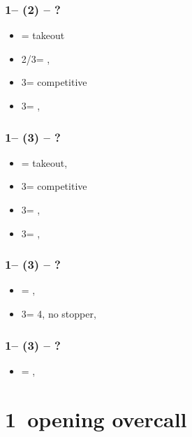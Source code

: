 \documentclass[12pt, a4paper]{report}
\begin{document}
\subsubsection*{1\diams -- (2\spades) -- ?}
\begin{itemize}
    \item \dbl = takeout
    \item 2\nt/3\clubs = \trsf{\clubs/\diams}, \invp
    \item 3\diams = competitive
    \item 3\hearts = \nat, \gf
\end{itemize}

\subsubsection*{1\diams -- (3\clubs) -- ?}
\begin{itemize}
    \item \dbl = takeout, \gf
    \item 3\diams = competitive
    \item 3\hearts = \spades, \invp
    \item 3\spades = \hearts, \gf
\end{itemize}

\subsubsection*{1\diams -- (3\hearts) -- ?}
\begin{itemize}
    \item \dbl = \spades, \gf
    \item 3\spades = 4\spades, no \hearts stopper, \gf
\end{itemize}

\subsubsection*{1\diams -- (3\spades) -- ?}
\begin{itemize}
    \item \dbl = \hearts, \gf
\end{itemize}

\section*{\colorbox{blue!30}{1\hearts\ opening overcall}}
\end{document}
